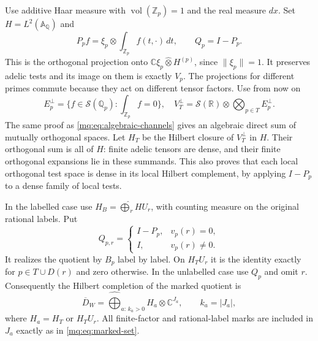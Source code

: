 \documentclass[11pt,a4paper]{article}
\theoremstyle{definition}\newtheorem{definition}[theorem]{Definition}
\newcommand{\Z}{\mathbb Z}\newcommand{\Q}{\mathbb Q}
\newcommand{\C}{\mathbb C}\newcommand{\R}{\mathbb R}
\begin{document}
Use additive Haar measure with $\operatorname{vol}(\Z_p)=1$ and
the real measure $dx$. Set $H=L^2(\mathbb A_\Q)$ and
\[
 P_pf=\xi_p\otimes\int_{\Z_p}f(t,\cdot)\,dt,
 \qquad Q_p=I-P_p.
 \tag{MQ12}\label{mq:eq:orthogonal-projection}
\]
This is the orthogonal projection onto
$\C\xi_p\widehat\otimes H^{(p)}$, since $\|\xi_p\|=1$.
It preserves adelic tests and its image on them is exactly $V_p$.
The projections for different primes commute because they act on
different tensor factors. Use from now on
\[
 E_p^\perp=\{f\in\mathcal S(\Q_p):\int_{\Z_p}f=0\},
 \quad V_T^\perp=\mathcal S(\mathbb R)\otimes
                  \bigotimes_{p\in T}E_p^\perp.
 \tag{MQ13}\label{mq:eq:orthogonal-channels}
\]
The same proof as \eqref{mq:eq:algebraic-channels} gives an algebraic
direct sum of mutually orthogonal spaces. Let $H_T$ be the Hilbert
closure of $V_T^\perp$ in $H$. Their orthogonal sum is all of $H$:
finite adelic tensors are dense, and their finite orthogonal
expansions lie in these summands. This also proves that each local
orthogonal test space is dense in its local Hilbert complement,
by applying $I-P_p$ to a dense family of local tests.

In the labelled case use
$H_B=\widehat\bigoplus_r HU_r$, with counting measure on the
original rational labels. Put
\[
 Q_{p,r}=\begin{cases}I-P_p,&v_p(r)=0,\\I,&v_p(r)\ne0.
 \end{cases}
 \tag{MQ14}\label{mq:eq:labelled-projection}
\]
It realizes the quotient by $B_p$ label by label. On $H_TU_r$
it is the identity exactly for $p\in T\cup D(r)$ and zero
otherwise. In the unlabelled case use $Q_p$ and omit $r$.
Consequently the Hilbert completion of the marked quotient is
\[
 \overline D_W=
 \widehat\bigoplus_{a:\,k_a>0} H_a\otimes\C^{J_a},
 \qquad k_a=|J_a|,
 \tag{MQ15}\label{mq:eq:marked-hilbert}
\]
where $H_a=H_T$ or $H_TU_r$. All finite-factor and rational-label
marks are included in $J_a$ exactly as in \eqref{mq:eq:marked-set}.
\end{document}
